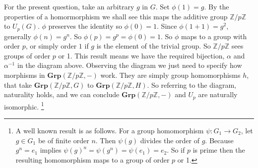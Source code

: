 \documentclass{article}
\begin{document}
For the present question, take an arbitrary $g$ in $G$. Set $\phi(1) = g$. By the properties of a homormorphism we shall see this maps the additive group $\mathds{Z}/p\mathds{Z}$ to $U_p(G)$. $\phi$ preserves the identity so $\phi(0) = 1$. Since $\phi(1 + 1) = g^2$, generally $\phi(n) = g^n$. So $\phi(p) = g^p = \phi(0) = 1$. So $\phi$ maps to a group with order $p$, or simply order $1$ if $g$ is the element of the trivial group. So $\mathds{Z}/p\mathds{Z}$ sees groups of order $p$ or 1. This result means we have the required bijection, $\alpha$ and $\alpha^{-1}$ in the diagram above. Observing the diagram we just need to specify how morphisms in $\mathbf{Grp}(\mathds{Z}/p\mathds{Z}, -)$ work. They are simply group homomorphisms $h$, that take $\mathbf{Grp}(\mathds{Z}/p\mathds{Z}, G)$ to $\mathbf{Grp}(\mathds{Z}/p\mathds{Z}, H)$. So referring to the diagram, naturality holds, and we can conclude $\mathbf{Grp}(\mathds{Z}/p\mathds{Z}, -)$ and $U_p$ are naturally isomorphic. \footnote{A well known result is as follows. For a group homomorphism $\psi: G_1 \rightarrow G_2$, let $g \in G_1$ be of finite order $n$. Then $\psi(g)$ divides the order of $g$. Because $g^n = e_1$ implies $\psi(g)^n = \psi(g^n) = \psi(e_1) = e_2$. So if $p$ is prime then the resulting homomorphism maps to a group of order $p$ or 1.}
\end{document}
